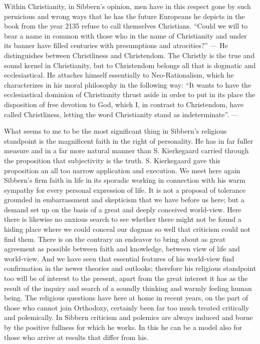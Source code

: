 \documentclass[12pt,a4paper,openany]{book}
\newcommand{\opage}[1]{\marginnote{\footnotesize\textit{[#1]}}}
\begin{document}
Within Christianity, in Sibbern's opinion, men have in this respect gone by such pernicious and wrong
\opage{97}ways that he has the future Europeans he depicts in
the book from the year 2135 refuse to call themselves Christians.
``Could we will to bear a name in common with those who
in the name of Christianity and under its banner have filled
centuries with presumptions and atrocities?'' --- He
distinguishes between Christliness and Christendom. The Christly
is the true and sound kernel in Christianity, but to
Christendom belongs all that is dogmatic and ecclesiastical.
He attaches himself essentially to Neo-Rationalism, which he
characterizes in his moral philosophy in the following way: ``It
wants to have the ecclesiastical dominion of Christianity thrust aside
in order to put in its place the disposition of free devotion to God,
which I, in contrast to Christendom, have called
Christliness, letting the word Christianity stand as indeterminate''. ---

What seems to me to be the most
significant thing in Sibbern's religious standpoint is the magnificent
faith in the right of personality. He has in far fuller
measure and in a far more natural manner than S. Kierkegaard
carried through the proposition that subjectivity is the truth.
S. Kierkegaard gave this proposition an all too narrow
application and execution. We meet here again Sibbern's firm
faith in life in its sporadic working in connection with
his warm sympathy for every personal expression of life. It
is not a proposal of tolerance grounded in embarrassment and skepticism
that we have before us here; but a demand set up on the basis of
a great and deeply conceived world-view.
Here there is likewise no anxious search to see whether there might not
be found a hiding place where we could conceal our dogmas
so well that criticism could not find them. There is
on the contrary an endeavor to bring about as great
agreement as possible between faith and knowledge, between
view of life and world-view. And we have seen that
essential features of his world-view find confirmation in
the newer theories and outlooks; therefore his
religious standpoint too will be of interest to the present, apart from the
great interest it has as the result of the inquiry and search of a soundly thinking
and warmly feeling human being. The religious
questions have here at home in recent years, on the part of those
\opage{98}who cannot join Orthodoxy, certainly been far too much
treated critically and polemically. In Sibbern
criticism and polemics are always induced and borne by the
positive fullness for which he works. In this he can be a model
also for those who arrive at results that differ from his.
\end{document}

